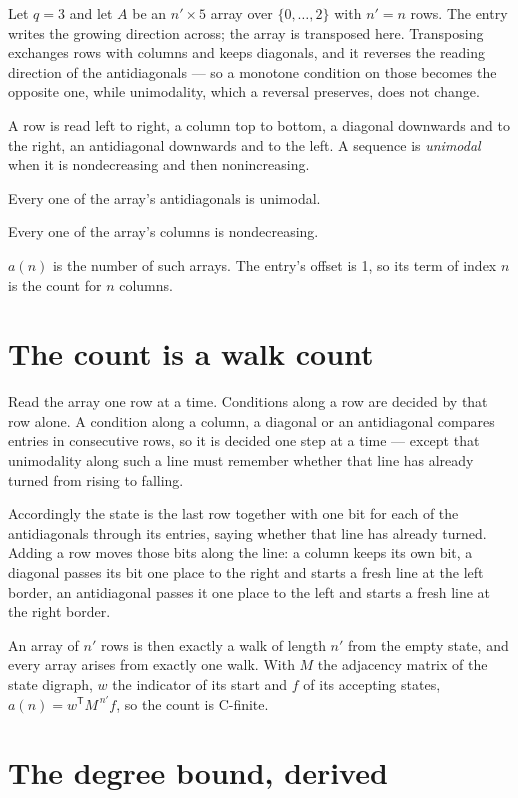 \documentclass[11pt]{article}
\theoremstyle{definition}
\begin{document}
Let $q = 3$ and let $A$ be an $n' \times 5$ array over $\{0,\dots,2\}$ with $n' = n$ rows. The entry writes the growing direction across; the array is transposed here. Transposing exchanges rows with columns and keeps diagonals, and it reverses the reading direction of the antidiagonals --- so a monotone condition on those becomes the opposite one, while unimodality, which a reversal preserves, does not change.

A row is read left to right, a column top to bottom, a diagonal downwards and to the right, an antidiagonal downwards and to the left. A sequence is {\itshape unimodal} when it is nondecreasing and then nonincreasing.

Every one of the array's antidiagonals is unimodal.

Every one of the array's columns is nondecreasing.

$a(n)$ is the number of such arrays. The entry's offset is 1, so its term of index $n$ is the count for $n$ columns.

\section{The count is a walk count}

Read the array one row at a time. Conditions along a row are decided by that row alone. A condition along a column, a diagonal or an antidiagonal compares entries in consecutive rows, so it is decided one step at a time --- except that unimodality along such a line must remember whether that line has already turned from rising to falling.

Accordingly the state is the last row together with one bit for each of the antidiagonals through its entries, saying whether that line has already turned. Adding a row moves those bits along the line: a column keeps its own bit, a diagonal passes its bit one place to the right and starts a fresh line at the left border, an antidiagonal passes it one place to the left and starts a fresh line at the right border.

An array of $n'$ rows is then exactly a walk of length $n'$ from the empty state, and every array arises from exactly one walk. With $M$ the adjacency matrix of the state digraph, $w$ the indicator of its start and $f$ of its accepting states, $a(n) = w^{\mathsf T}M^{\,n'}f$, so the count is C-finite.

\section{The degree bound, derived}
\end{document}
